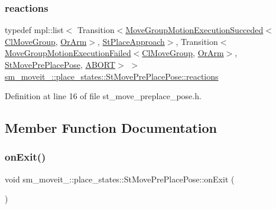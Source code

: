 \subsubsection{\texorpdfstring{reactions}{reactions}}
{\footnotesize\ttfamily typedef mpl\+::list$<$ Transition$<$\hyperlink{structmoveit__z__client_1_1MoveGroupMotionExecutionSucceded}{Move\+Group\+Motion\+Execution\+Succeded}$<$\hyperlink{classmoveit__z__client_1_1ClMoveGroup}{Cl\+Move\+Group}, \hyperlink{classsm__moveit__4_1_1OrArm}{Or\+Arm}$>$, \hyperlink{structsm__moveit__4_1_1place__states_1_1StPlaceApproach}{St\+Place\+Approach}$>$, Transition$<$\hyperlink{structmoveit__z__client_1_1MoveGroupMotionExecutionFailed}{Move\+Group\+Motion\+Execution\+Failed}$<$\hyperlink{classmoveit__z__client_1_1ClMoveGroup}{Cl\+Move\+Group}, \hyperlink{classsm__moveit__4_1_1OrArm}{Or\+Arm}$>$, \hyperlink{structsm__moveit__4_1_1place__states_1_1StMovePrePlacePose}{St\+Move\+Pre\+Place\+Pose}, \hyperlink{classABORT}{A\+B\+O\+RT}$>$ $>$ \hyperlink{structsm__moveit__4_1_1place__states_1_1StMovePrePlacePose_a24b1fad7c03fc89a7f81699b7bcd63de}{sm\+\_\+moveit\+\_\+::place\+\_\+states\+::\+St\+Move\+Pre\+Place\+Pose\+::reactions}}



Definition at line 16 of file st\+\_\+move\+\_\+preplace\+\_\+pose.\+h.



\subsection{Member Function Documentation}
\mbox{\label{structsm__moveit__4_1_1place__states_1_1StMovePrePlacePose_a4c62c5fdaa740b27f6af5c47d3507dad}} 
\subsubsection{\texorpdfstring{on\+Exit()}{onExit()}}
{\footnotesize\ttfamily void sm\+\_\+moveit\+\_\+::place\+\_\+states\+::\+St\+Move\+Pre\+Place\+Pose\+::on\+Exit (\begin{DoxyParamCaption}{ }\end{DoxyParamCaption})\hspace{0.3cm}{\ttfamily [inline]}}




